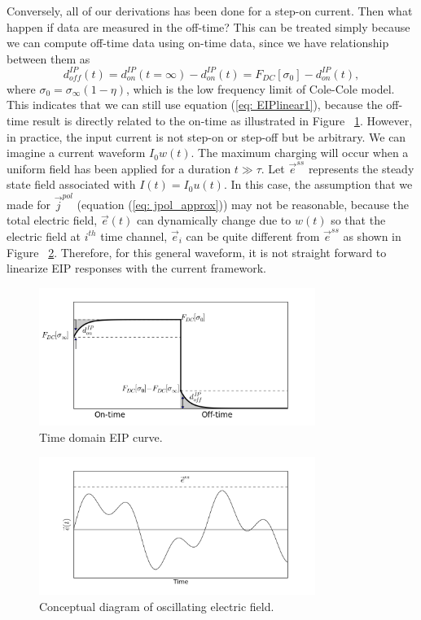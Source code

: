 \documentclass[a4paper, 11pt]{article}
\newcommand{\siginf}{\sigma_\infty}
\renewcommand {\j}  { {\vec j} }
\newcommand {\e}  { {\vec e} }
\newcommand{\dip}{d^{IP}}
\begin{document}
Conversely, all of our derivations has been done for a step-on current. Then what happen if data are measured in the off-time? This can be treated simply because we can compute off-time data using on-time data, since we have relationship between them as
\begin{equation}
  \dip_{off}(t) = \dip_{on}(t=\infty) - \dip_{on}(t) = F_{DC}[\sigma_0] - \dip_{on}(t),
\end{equation}
where $\sigma_0 = \siginf(1-\eta)$, which is the low frequency limit of Cole-Cole model. This indicates that we can still use equation (\ref{eq: EIPlinear1}), because the off-time result is directly related to the on-time as illustrated in Figure ~\ref{Fig:EIPcurve}. However, in practice, the input current is not step-on or step-off but be arbitrary. We can imagine a current waveform $I_0w(t)$. The maximum charging will occur when a uniform field has been applied for a duration $t \gg \tau$. Let $\e^{ss}$ represents the steady state field associated with $I(t) = I_0u(t)$. In this case, the assumption that we made for $\j^{pol}$ (equation (\ref{eq: jpol_approx})) may not be reasonable, because the total electric field, $\e(t)$ can dynamically change due to $w(t)$ so that the electric field at $i^{th}$ time channel, $\e_i$ can be quite different from $\e^{ss}$ as shown in Figure ~\ref{Fig:Oscillating_e}. Therefore, for this general waveform, it is not straight forward to linearize EIP responses with the current framework. 

\begin{figure}[htb]
  \centering
  \includegraphics[width=0.8\textwidth]{figures/EIPcurve.png}
  \caption{Time domain EIP curve. }
  \label{Fig:EIPcurve}
\end{figure}
\begin{figure}[htb]
  \centering
  \includegraphics[width=0.8\textwidth]{figures/Oscillating_e.png}
  \caption{Conceptual diagram of oscillating electric field.}
  \label{Fig:Oscillating_e}
\end{figure}
\clearpage
\end{document}
